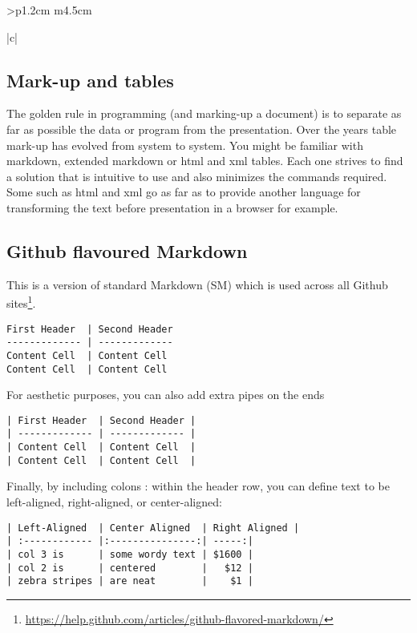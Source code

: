 \begin{tabular}{>{\bfseries}p{1.2cm} m{4.5cm}}
\begin{tabular}[t]{|c|}
\begin{longtable}
\pgfplotstablesort{}
\pgfplotstabletypeset[columns/c/.style={string type}]{\result}%



\section{Mark-up and tables}

The golden rule in programming (and marking-up a document)  is to separate
as far as possible the data or program from the presentation. Over the years table mark-up has evolved from system to system. You might be familiar with markdown, extended markdown or html and xml tables. Each one strives to find a solution that is intuitive to use and also minimizes the commands required. Some such as html and xml go as far as to provide another language for transforming the text before presentation in a browser for example.

\subsection{Github flavoured Markdown}

This is a version of standard Markdown (SM) which is used across all Github sites\footnote{ \url{https://help.github.com/articles/github-flavored-markdown/}}. 

\begin{scriptexample}{}{}
\begin{verbatim}
First Header  | Second Header
------------- | -------------
Content Cell  | Content Cell
Content Cell  | Content Cell
\end{verbatim}
\end{scriptexample}

For aesthetic purposes, you can also add extra pipes on the ends

\begin{verbatim}
| First Header  | Second Header |
| ------------- | ------------- |
| Content Cell  | Content Cell  |
| Content Cell  | Content Cell  |
\end{verbatim}

Finally, by including colons : within the header row, you can define text to be left-aligned, right-aligned, or center-aligned:

\begin{verbatim}
| Left-Aligned  | Center Aligned  | Right Aligned |
| :------------ |:---------------:| -----:|
| col 3 is      | some wordy text | $1600 |
| col 2 is      | centered        |   $12 |
| zebra stripes | are neat        |    $1 |
\end{verbatim}



\end{longtable}
\end{tabular}
\end{tabular}
